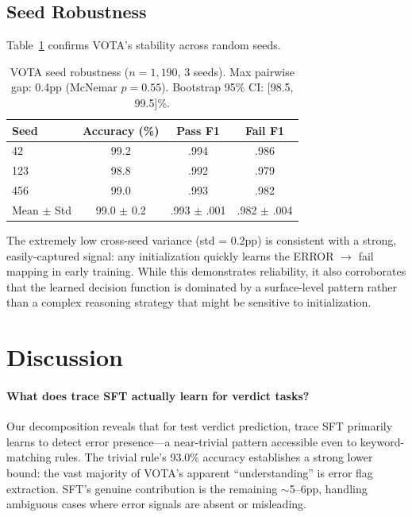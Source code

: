 \documentclass[11pt,a4paper]{article}
\begin{document}
\subsection{Seed Robustness}
\label{sec:seeds}

Table~\ref{tab:seeds} confirms VOTA's stability across random seeds.

\begin{table}[t]
\centering
\small
\begin{tabular}{lccc}
\toprule
\textbf{Seed} & \textbf{Accuracy (\%)} & \textbf{Pass F1} & \textbf{Fail F1} \\
\midrule
42 & 99.2 & .994 & .986 \\
123 & 98.8 & .992 & .979 \\
456 & 99.0 & .993 & .982 \\
\midrule
Mean $\pm$ Std & 99.0 $\pm$ 0.2 & .993 $\pm$ .001 & .982 $\pm$ .004 \\
\bottomrule
\end{tabular}
\caption{VOTA seed robustness ($n=1{,}190$, 3 seeds). Max pairwise gap: 0.4pp (McNemar $p=0.55$). Bootstrap 95\% CI: [98.5, 99.5]\%.}
\label{tab:seeds}
\end{table}

The extremely low cross-seed variance (std = 0.2pp) is consistent with a strong, easily-captured signal: any initialization quickly learns the ERROR $\to$ fail mapping in early training.
While this demonstrates reliability, it also corroborates that the learned decision function is dominated by a surface-level pattern rather than a complex reasoning strategy that might be sensitive to initialization.

\section{Discussion}
\label{sec:discussion}

\paragraph{What does trace SFT actually learn for verdict tasks?}

Our decomposition reveals that for test verdict prediction, trace SFT primarily learns to detect error presence---a near-trivial pattern accessible even to keyword-matching rules.
The trivial rule's 93.0\% accuracy establishes a strong lower bound: the vast majority of VOTA's apparent ``understanding'' is error flag extraction.
SFT's genuine contribution is the remaining $\sim$5--6pp, handling ambiguous cases where error signals are absent or misleading.
\end{document}

